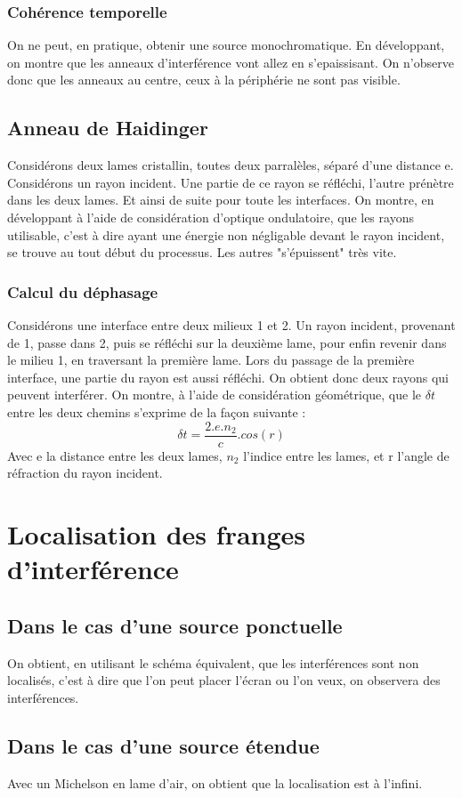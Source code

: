 \subsubsection{Cohérence temporelle}
On ne peut, en pratique, obtenir une source monochromatique. En développant, on montre que les anneaux d'interférence vont allez en s'epaissisant. On n'observe donc que les anneaux au centre, ceux à la périphérie ne sont pas visible.
\subsection{Anneau de Haidinger}
Considérons deux lames cristallin, toutes deux parralèles, séparé d'une distance e. Considérons un rayon incident. Une partie de ce rayon se réfléchi, l'autre prénètre dans les deux lames. Et ainsi de suite pour toute les interfaces. On montre, en développant à l'aide de considération d'optique ondulatoire, que les rayons utilisable, c'est à dire ayant une énergie non négligable devant le rayon incident, se trouve au tout début du processus. Les autres "s'épuissent" très vite.
\subsubsection{Calcul du déphasage}
Considérons une interface entre deux milieux 1 et 2. Un rayon incident, provenant de 1, passe dans 2, puis se réfléchi sur la deuxième lame, pour enfin revenir dans le milieu 1, en traversant la première lame. Lors du passage de la première interface, une partie du rayon est aussi réfléchi. On obtient donc deux rayons qui peuvent interférer. On montre, à l'aide de considération géométrique, que le $\delta t$ entre les deux chemins s'exprime de la façon suivante : 
$$\delta t = \dfrac{2.e.n_2}{c}.cos(r)$$
Avec e la distance entre les deux lames, $n_2$ l'indice entre les lames, et r l'angle de réfraction du rayon incident.
\section{Localisation des franges d'interférence}
\subsection{Dans le cas d'une source ponctuelle}
On obtient, en utilisant le schéma équivalent, que les interférences sont non localisés, c'est à dire que l'on peut placer l'écran ou l'on veux, on observera des interférences.
\subsection{Dans le cas d'une source étendue}
Avec un Michelson en lame d'air, on obtient que la localisation est à l'infini.
